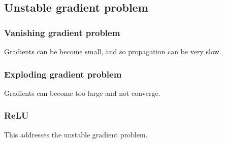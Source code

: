 
\subsection{Unstable gradient problem}

\subsubsection{Vanishing gradient problem}

Gradients can be become small, and so propagation can be very slow.

\subsubsection{Exploding gradient problem}

Gradients can become too large and not converge.

\subsubsection{ReLU}

This addresses the unstable gradient problem.

